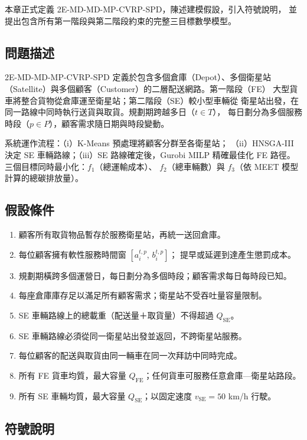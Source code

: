 \documentclass[11pt, a4paper]{article}
\newcommand{\QFE}{Q_{\mathrm{FE}}}
\newcommand{\QSE}{Q_{\mathrm{SE}}}
\newcommand{\vSE}{v_{\mathrm{SE}}}
\numberwithin{equation}{section}
\begin{document}
本章正式定義 2E-MD-MD-MP-CVRP-SPD，陳述建模假設，引入符號說明，
並提出包含所有第一階段與第二階段約束的完整三目標數學模型。

\subsection{問題描述}

2E-MD-MD-MP-CVRP-SPD 定義於包含多個倉庫（Depot）、多個衛星站
（Satellite）與多個顧客（Customer）的二層配送網路。第一階段（FE）
大型貨車將整合貨物從倉庫運至衛星站；第二階段（SE）較小型車輛從
衛星站出發，在同一路線中同時執行送貨與取貨。規劃期跨越多日（$t\in T$），
每日劃分為多個服務時段（$p\in P$），顧客需求隨日期與時段變動。

系統運作流程：（i）K-Means 預處理將顧客分群至各衛星站；
（ii）HNSGA-III 決定 SE 車輛路線；（iii）SE 路線確定後，Gurobi MILP
精確最佳化 FE 路徑。三個目標同時最小化：$f_1$（總運輸成本）、
$f_2$（總車輛數）與 $f_3$（依 MEET 模型計算的總碳排放量）。

\subsection{假設條件}

\begin{enumerate}
  \item 顧客所有取貨物品暫存於服務衛星站，再統一送回倉庫。
  \item 每位顧客擁有軟性服務時間窗 $[a_i^{t,p},\,b_i^{t,p}]$；
        提早或延遲到達產生懲罰成本。
  \item 規劃期橫跨多個運營日，每日劃分為多個時段；顧客需求每日每時段已知。
  \item 每座倉庫庫存足以滿足所有顧客需求；衛星站不受吞吐量容量限制。
  \item SE 車輛路線上的總載重（配送量＋取貨量）不得超過 $\QSE$。
  \item SE 車輛路線必須從同一衛星站出發並返回，不跨衛星站服務。
  \item 每位顧客的配送與取貨由同一輛車在同一次拜訪中同時完成。
  \item 所有 FE 貨車均質，最大容量 $\QFE$；任何貨車可服務任意倉庫—衛星站路段。
  \item 所有 SE 車輛均質，最大容量 $\QSE$；以固定速度 $\vSE=50$ km/h 行駛。
\end{enumerate}

\subsection{符號說明}
\end{document}
